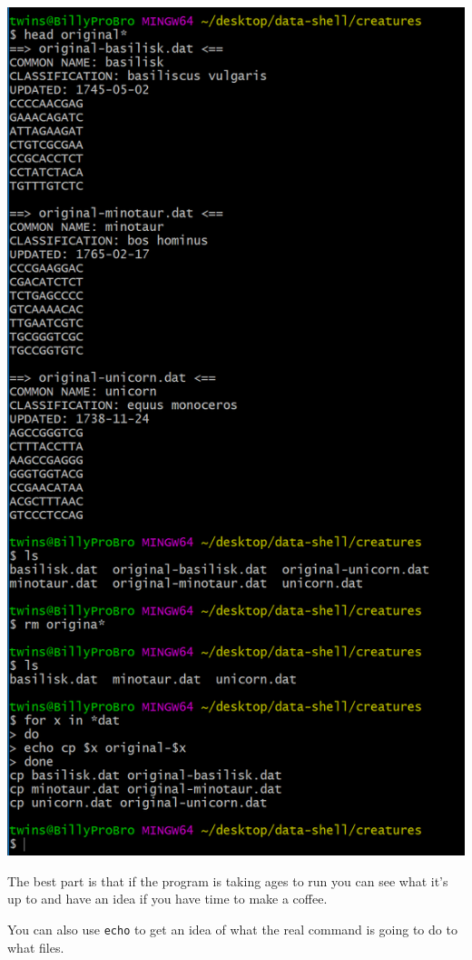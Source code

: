 \documentclass[12pt]{article}
\begin{document}
\begin{center}
\includegraphics[scale=1]{imgusingecho.PNG}    
\end{center}

The best part is that if the program is taking ages to run you can see what it's up to and have an idea if you have time to make a coffee.

You can also use \texttt{echo} to get an idea of what the real command is going to do to what files.
\end{document}
